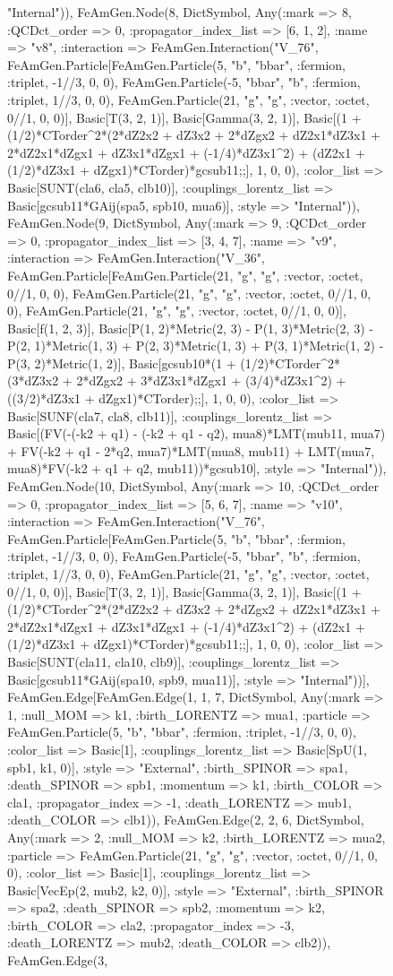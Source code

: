 \documentclass{revtex4}
\begin{document}
\begin{figure}[!htb]
\begin{center}
{"Internal")), FeAmGen.Node(8, Dict{Symbol, Any}(:mark => 8, :QCDct_order => 0, :propagator_index_list => [6, 1, 2], :name => "v8", :interaction => FeAmGen.Interaction("V_76", FeAmGen.Particle[FeAmGen.Particle(5, "b", "bbar", :fermion, :triplet, -1//3, 0, 0), FeAmGen.Particle(-5, "bbar", "b", :fermion, :triplet, 1//3, 0, 0), FeAmGen.Particle(21, "g", "g", :vector, :octet, 0//1, 0, 0)], Basic[T(3, 2, 1)], Basic[Gamma(3, 2, 1)], Basic[(1 + (1/2)*CTorder^2*(2*dZ2x2 + dZ3x2 + 2*dZgx2 + dZ2x1*dZ3x1 + 2*dZ2x1*dZgx1 + dZ3x1*dZgx1 + (-1/4)*dZ3x1^2) + (dZ2x1 + (1/2)*dZ3x1 + dZgx1)*CTorder)*gcsub11;;], 1, 0, 0), :color_list => Basic[SUNT(cla6, cla5, clb10)], :couplings_lorentz_list => Basic[gcsub11*GAij(spa5, spb10, mua6)], :style => "Internal")), FeAmGen.Node(9, Dict{Symbol, Any}(:mark => 9, :QCDct_order => 0, :propagator_index_list => [3, 4, 7], :name => "v9", :interaction => FeAmGen.Interaction("V_36", FeAmGen.Particle[FeAmGen.Particle(21, "g", "g", :vector, :octet, 0//1, 0, 0), FeAmGen.Particle(21, "g", "g", :vector, :octet, 0//1, 0, 0), FeAmGen.Particle(21, "g", "g", :vector, :octet, 0//1, 0, 0)], Basic[f(1, 2, 3)], Basic[P(1, 2)*Metric(2, 3) - P(1, 3)*Metric(2, 3) - P(2, 1)*Metric(1, 3) + P(2, 3)*Metric(1, 3) + P(3, 1)*Metric(1, 2) - P(3, 2)*Metric(1, 2)], Basic[gcsub10*(1 + (1/2)*CTorder^2*(3*dZ3x2 + 2*dZgx2 + 3*dZ3x1*dZgx1 + (3/4)*dZ3x1^2) + ((3/2)*dZ3x1 + dZgx1)*CTorder);;], 1, 0, 0), :color_list => Basic[SUNF(cla7, cla8, clb11)], :couplings_lorentz_list => Basic[(FV(-(-k2 + q1) - (-k2 + q1 - q2), mua8)*LMT(mub11, mua7) + FV(-k2 + q1 - 2*q2, mua7)*LMT(mua8, mub11) + LMT(mua7, mua8)*FV(-k2 + q1 + q2, mub11))*gcsub10], :style => "Internal")), FeAmGen.Node(10, Dict{Symbol, Any}(:mark => 10, :QCDct_order => 0, :propagator_index_list => [5, 6, 7], :name => "v10", :interaction => FeAmGen.Interaction("V_76", FeAmGen.Particle[FeAmGen.Particle(5, "b", "bbar", :fermion, :triplet, -1//3, 0, 0), FeAmGen.Particle(-5, "bbar", "b", :fermion, :triplet, 1//3, 0, 0), FeAmGen.Particle(21, "g", "g", :vector, :octet, 0//1, 0, 0)], Basic[T(3, 2, 1)], Basic[Gamma(3, 2, 1)], Basic[(1 + (1/2)*CTorder^2*(2*dZ2x2 + dZ3x2 + 2*dZgx2 + dZ2x1*dZ3x1 + 2*dZ2x1*dZgx1 + dZ3x1*dZgx1 + (-1/4)*dZ3x1^2) + (dZ2x1 + (1/2)*dZ3x1 + dZgx1)*CTorder)*gcsub11;;], 1, 0, 0), :color_list => Basic[SUNT(cla11, cla10, clb9)], :couplings_lorentz_list => Basic[gcsub11*GAij(spa10, spb9, mua11)], :style => "Internal"))], FeAmGen.Edge[FeAmGen.Edge(1, 1, 7, Dict{Symbol, Any}(:mark => 1, :null_MOM => k1, :birth_LORENTZ => mua1, :particle => FeAmGen.Particle(5, "b", "bbar", :fermion, :triplet, -1//3, 0, 0), :color_list => Basic[1], :couplings_lorentz_list => Basic[SpU(1, spb1, k1, 0)], :style => "External", :birth_SPINOR => spa1, :death_SPINOR => spb1, :momentum => k1, :birth_COLOR => cla1, :propagator_index => -1, :death_LORENTZ => mub1, :death_COLOR => clb1)), FeAmGen.Edge(2, 2, 6, Dict{Symbol, Any}(:mark => 2, :null_MOM => k2, :birth_LORENTZ => mua2, :particle => FeAmGen.Particle(21, "g", "g", :vector, :octet, 0//1, 0, 0), :color_list => Basic[1], :couplings_lorentz_list => Basic[VecEp(2, mub2, k2, 0)], :style => "External", :birth_SPINOR => spa2, :death_SPINOR => spb2, :momentum => k2, :birth_COLOR => cla2, :propagator_index => -3, :death_LORENTZ => mub2, :death_COLOR => clb2)), FeAmGen.Edge(3, }
\end{center}
\end{figure}
\end{document}
